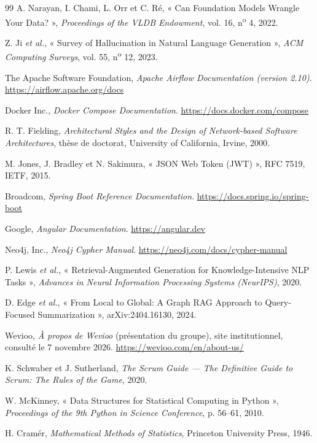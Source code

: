 \begin{thebibliography}{99}
 A. Narayan, I. Chami, L. Orr et C. Ré, « Can Foundation Models Wrangle Your Data? », \textit{Proceedings of the VLDB Endowment}, vol. 16, n\textsuperscript{o} 4, 2022.

 Z. Ji \textit{et al.}, « Survey of Hallucination in Natural Language Generation », \textit{ACM Computing Surveys}, vol. 55, n\textsuperscript{o} 12, 2023.

 The Apache Software Foundation, \textit{Apache Airflow Documentation (version 2.10)}. \url{https://airflow.apache.org/docs}

 Docker Inc., \textit{Docker Compose Documentation}. \url{https://docs.docker.com/compose}

 R. T. Fielding, \textit{Architectural Styles and the Design of Network-based Software Architectures}, thèse de doctorat, University of California, Irvine, 2000.

 M. Jones, J. Bradley et N. Sakimura, « JSON Web Token (JWT) », RFC 7519, IETF, 2015.

 Broadcom, \textit{Spring Boot Reference Documentation}. \url{https://docs.spring.io/spring-boot}

 Google, \textit{Angular Documentation}. \url{https://angular.dev}

 Neo4j, Inc., \textit{Neo4j Cypher Manual}. \url{https://neo4j.com/docs/cypher-manual}

 P. Lewis \textit{et al.}, « Retrieval-Augmented Generation for Knowledge-Intensive NLP Tasks », \textit{Advances in Neural Information Processing Systems (NeurIPS)}, 2020.

 D. Edge \textit{et al.}, « From Local to Global: A Graph RAG Approach to Query-Focused Summarization », arXiv:2404.16130, 2024.

 Wevioo, \textit{À propos de Wevioo} (présentation du groupe), site institutionnel, consulté le 7 novembre 2026. \url{https://wevioo.com/en/about-us/}

 K. Schwaber et J. Sutherland, \textit{The Scrum Guide — The Definitive Guide to Scrum: The Rules of the Game}, 2020.

 W. McKinney, « Data Structures for Statistical Computing in Python », \textit{Proceedings of the 9th Python in Science Conference}, p. 56--61, 2010.

 H. Cramér, \textit{Mathematical Methods of Statistics}, Princeton University Press, 1946.

\end{thebibliography}
